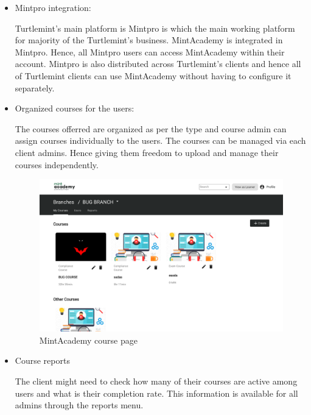 \begin{itemize}
    \item Mintpro integration:

    Turtlemint's main platform is Mintpro is which the main working platform
    for majority of the Turtlemint's business. MintAcademy is integrated in
    Mintpro. Hence, all Mintpro users can access MintAcademy within their
    account. Mintpro is also distributed across Turtlemint's clients and hence
    all of Turtlemint clients can use MintAcademy without having to configure
    it separately.

    \item Organized courses for the users:
    
    The courses offerred are organized as per the type and course admin can
    assign courses individually to the users. The courses can be managed via
    each client admins. Hence giving them freedom to upload and manage their
    courses independently.

    \begin{figure}
        \includegraphics[width=\textwidth]{ch5/lms_courses.png}
        \caption{MintAcademy course page}
    \end{figure}

    \item Course reports
    
    The client might need to check how many of their courses are active among
    users and what is their completion rate. This information is available for
    all admins through the reports menu.


\end{itemize}
